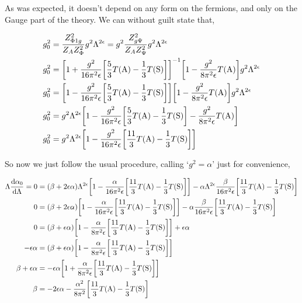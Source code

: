 As was expected, it doesn't depend on any form on the fermions, and only 
on the Gauge part of the theory. We can without guilt state that,

\begin{align}
    g_0^2&=\frac{Z_{\Phi1g}^2}{Z_AZ_\Phi^2}g^2\Lambda^{2\epsilon}=g^2\frac{Z_{g\Psi}^2}{Z_AZ_\Psi^2}g^2\Lambda^{2\epsilon}\nonumber\\
    g_0^2&=\qty[1+\frac{g^2}{16\pi^2\epsilon}\qty[\frac{5}{3}T\qty(\textnormal{A})-\frac13T\qty(\textnormal{S})]]^{-1}\qty[1-\frac{g^2}{8\pi^2\epsilon}T\qty(\textnormal{A})]g^2\Lambda^{2\epsilon}\nonumber\\
    g_0^2&=\qty[1-\frac{g^2}{16\pi^2\epsilon}\qty[\frac{5}{3}T\qty(\textnormal{A})-\frac13T\qty(\textnormal{S})]]\qty[1-\frac{g^2}{8\pi^2\epsilon}T\qty(\textnormal{A})]g^2\Lambda^{2\epsilon}\nonumber\\
    g_0^2&=g^2\Lambda^{2\epsilon}\qty[1-\frac{g^2}{16\pi^2\epsilon}\qty[\frac{5}{3}T\qty(\textnormal{A})-\frac13T\qty(\textnormal{S})]-\frac{g^2}{8\pi^2\epsilon}T\qty(\textnormal{A})]\nonumber\\
    g_0^2&=g^2\Lambda^{2\epsilon}\qty[1-\frac{g^2}{16\pi^2\epsilon}\qty[\frac{11}{3}T\qty(\textnormal{A})-\frac13T\qty(\textnormal{S})]]\nonumber
\end{align}

So now we just follow the usual procedure, calling `$g^2=\alpha$' just for 
convenience,

\begin{align}
    \Lambda\dv{\alpha_0}{\Lambda}=0&=\qty(\beta+2\epsilon \alpha)\Lambda^{2\epsilon}\qty[1-\frac{\alpha}{16\pi^2\epsilon}\qty[\frac{11}{3}T\qty(\textnormal{A})-\frac13T\qty(\textnormal{S})]]-\alpha\Lambda^{2\epsilon}\frac{\beta}{16\pi^2\epsilon}\qty[\frac{11}{3}T\qty(\textnormal{A})-\frac13T\qty(\textnormal{S})]\nonumber\\
    0&=\qty(\beta+2\epsilon \alpha)\qty[1-\frac{\alpha}{16\pi^2\epsilon}\qty[\frac{11}{3}T\qty(\textnormal{A})-\frac13T\qty(\textnormal{S})]]-\alpha\frac{\beta}{16\pi^2\epsilon}\qty[\frac{11}{3}T\qty(\textnormal{A})-\frac13T\qty(\textnormal{S})]\nonumber\\
    0&=\qty(\beta+\epsilon \alpha)\qty[1-\frac{\alpha}{8\pi^2\epsilon}\qty[\frac{11}{3}T\qty(\textnormal{A})-\frac13T\qty(\textnormal{S})]]+\epsilon\alpha\nonumber\\
    -\epsilon\alpha&=\qty(\beta+\epsilon \alpha)\qty[1-\frac{\alpha}{8\pi^2\epsilon}\qty[\frac{11}{3}T\qty(\textnormal{A})-\frac13T\qty(\textnormal{S})]]\nonumber\\
    \beta+\epsilon \alpha&=-\epsilon\alpha\qty[1+\frac{\alpha}{8\pi^2\epsilon}\qty[\frac{11}{3}T\qty(\textnormal{A})-\frac13T\qty(\textnormal{S})]]\nonumber\\
    \beta&=-2\epsilon\alpha -\frac{\alpha^2}{8\pi^2}\qty[\frac{11}{3}T\qty(\textnormal{A})-\frac13T\qty(\textnormal{S})]\nonumber
\end{align}

